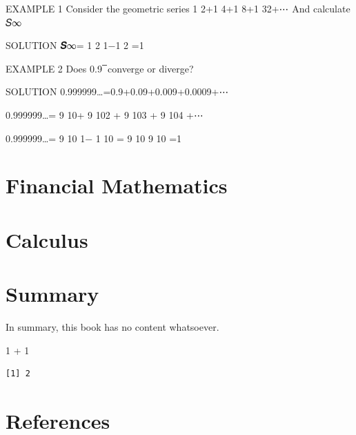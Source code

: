 \documentclass[
  letterpaper,
  DIV=11,
  numbers=noendperiod]{scrreprt}
\newenvironment{Shaded}{\begin{snugshade}}{\end{snugshade}}
\newcommand{\DecValTok}[1]{\textcolor[rgb]{0.68,0.00,0.00}{#1}}
\newcommand{\SpecialCharTok}[1]{\textcolor[rgb]{0.37,0.37,0.37}{#1}}
\newlength{\cslhangindent}
\newenvironment{CSLReferences}[2] %
 {\begin{list}{}{%
  \setlength{\itemindent}{0pt}
  \setlength{\leftmargin}{0pt}
  \setlength{\parsep}{0pt}
  \ifodd #1
   \setlength{\leftmargin}{\cslhangindent}
   \setlength{\itemindent}{-1\cslhangindent}
  \fi
  \setlength{\itemsep}{#2\baselineskip}}}
 {\end{list}}
\begin{document}
EXAMPLE 1 Consider the geometric series 1 2+1 4+1 8+1 32+⋯ And calculate
𝑆∞

SOLUTION 𝑺∞= 1 2 1−1 2 =1

EXAMPLE 2 Does 0.9 ̅ converge or diverge?

SOLUTION 0.999999\ldots=0.9+0.09+0.009+0.0009+⋯

0.999999\ldots= 9 10+ 9 102 + 9 103 + 9 104 +⋯

0.999999\ldots= 9 10 1− 1 10 = 9 10 9 10 =1


\chapter{Financial Mathematics}\label{financial-mathematics}


\chapter{Calculus}\label{calculus}


\chapter{Summary}\label{summary}

In summary, this book has no content whatsoever.

\begin{Shaded}
\begin{Highlighting}[]
\DecValTok{1} \SpecialCharTok{+} \DecValTok{1}
\end{Highlighting}
\end{Shaded}

\begin{verbatim}
[1] 2
\end{verbatim}


\chapter*{References}\label{references}


\label{refs}
\begin{CSLReferences}{0}{1}
\end{CSLReferences}
\end{document}
